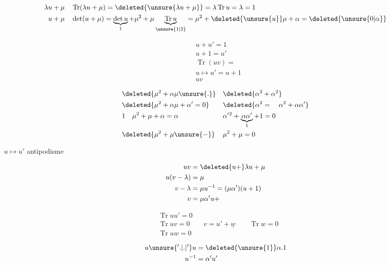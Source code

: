 

\[
\begin{aligned}
\lambda u+\mu\quad &\operatorname{Tr}(\lambda u+\mu)=\deleted{\unsure{\lambda u+\mu}}=\lambda\operatorname{Tr}u=\lambda=1\\
u+\mu\quad &\det(u+\mu)=\underbrace{\det u}_{1}+\mu^2+\mu\underbrace{\operatorname{Tr}u}_{\unsure{1|2}}
=\mu^2+\deleted{\unsure{u}}\mu+\alpha=\deleted{\unsure{0|\alpha}}
\end{aligned}
\]

\[
\begin{aligned}
&u+u'=1\\
&u+1=u'\\
&\operatorname{Tr}(uv)=\\
&u\longmapsto u'=u+1\\
&uv
\end{aligned}
\]

\[
\begin{aligned}
&\deleted{\mu^2+\alpha\mu\unsure{.}}&&\deleted{\alpha^2+\alpha^2}\\
&\deleted{\mu^2+\alpha\mu+\alpha'=0}&&\deleted{\alpha^2=\quad\alpha^2+\alpha\alpha'}\\
&1\quad\mu^2+\mu+\alpha=\alpha&&\alpha'{}^2+\underbrace{\alpha\alpha'}_{1}+1=0\\
&\deleted{\mu^2+\mu\unsure{-}}&&\mu^2+\mu=0
\end{aligned}
\]

$u\longmapsto u'$ antipodisme

\[
\begin{aligned}
uv&=\deleted{u+}\lambda u+\mu\\
u(v-\lambda)&=\mu\\
v-\lambda&=\mu u^{-1}=(\mu\alpha')(u+1)\\
v&=\mu\alpha'u+
\end{aligned}
\]

\[
\begin{aligned}
&\operatorname{Tr}uu'=0\\
&\operatorname{Tr}uv=0\qquad v=u'+\underline w\qquad \operatorname{Tr}w=0\\
&\operatorname{Tr}uw=0
\end{aligned}
\]

\[
\begin{aligned}
u\unsure{'.|.|'}u&=\deleted{\unsure{1}}\alpha.1\\
u^{-1}&=\alpha'u'
\end{aligned}
\]

